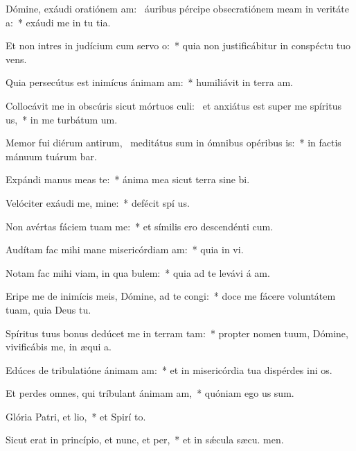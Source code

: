 \item Dómine, exáudi oratiónem am:~\pscross{} áuribus pércipe obsecratiónem meam in veritáte a:~* exáudi me in tu tia.
\item Et non intres in judícium cum servo o:~* quia non justificábitur in conspéctu tuo  vens.
\item Quia persecútus est inimícus ánimam am:~* humiliávit in terra  am.
\item Collocávit me in obscúris sicut mórtuos culi:~\pscross{} et anxiátus est super me spíritus us,~* in me turbátum   um.
\item Memor fui diérum antirum,~\pscross{} meditátus sum in ómnibus opéribus is:~* in factis mánuum tuárum bar.
\item Expándi manus meas  te:~* ánima mea sicut terra sine  bi.
\item Velóciter exáudi me, mine:~* defécit spí us.
\item Non avértas fáciem tuam  me:~* et símilis ero descendénti  cum.
\item Audítam fac mihi mane misericórdiam am:~* quia in  vi.
\item Notam fac mihi viam, in qua bulem:~* quia ad te levávi á am.
\item Eripe me de inimícis meis, Dómine, ad te congi:~* doce me fácere voluntátem tuam, quia Deus   tu.
\item Spíritus tuus bonus dedúcet me in terram tam:~* propter nomen tuum, Dómine, vivificábis me, in æqui a.
\item Edúces de tribulatióne ánimam am:~* et in misericórdia tua dispérdes ini os.
\item Et perdes omnes, qui tríbulant ánimam am,~* quóniam ego  us sum.
\item Glória Patri, et lio,~* et Spirí to.
\item Sicut erat in princípio, et nunc, et per,~* et in sǽcula sæcu. men.
